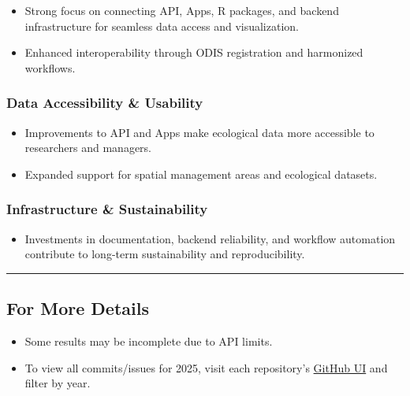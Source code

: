 \documentclass[
  letterpaper,
  DIV=11,
  numbers=noendperiod]{scrreprt}
\providecommand{\tightlist}{%
  \setlength{\itemsep}{0pt}\setlength{\parskip}{0pt}}
\begin{document}
\begin{itemize}
\tightlist
\item
  Strong focus on connecting API, Apps, R packages, and backend
  infrastructure for seamless data access and visualization.
\item
  Enhanced interoperability through ODIS registration and harmonized
  workflows.
\end{itemize}

\subsubsection{Data Accessibility \&
Usability}\label{data-accessibility-usability}

\begin{itemize}
\tightlist
\item
  Improvements to API and Apps make ecological data more accessible to
  researchers and managers.
\item
  Expanded support for spatial management areas and ecological datasets.
\end{itemize}

\subsubsection{Infrastructure \&
Sustainability}\label{infrastructure-sustainability}

\begin{itemize}
\tightlist
\item
  Investments in documentation, backend reliability, and workflow
  automation contribute to long-term sustainability and reproducibility.
\end{itemize}

\begin{center}\rule{0.5\linewidth}{0.5pt}\end{center}

\subsection{For More Details}\label{for-more-details}

\begin{itemize}
\tightlist
\item
  Some results may be incomplete due to API limits.\\
\item
  To view all commits/issues for 2025, visit each repository's
  \href{https://github.com/CalCOFI}{GitHub UI} and filter by year.
\end{itemize}
\end{document}

